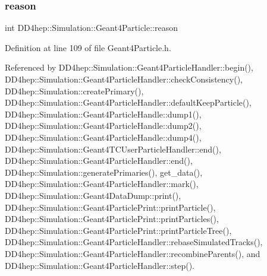\hypertarget{class_d_d4hep_1_1_simulation_1_1_geant4_particle_a290a8ba466d76df567c0a9809a80fbc1}{}\label{class_d_d4hep_1_1_simulation_1_1_geant4_particle_a290a8ba466d76df567c0a9809a80fbc1} 
\subsubsection{\texorpdfstring{reason}{reason}}
{\footnotesize\ttfamily int D\+D4hep\+::\+Simulation\+::\+Geant4\+Particle\+::reason}



Definition at line 109 of file Geant4\+Particle.\+h.



Referenced by D\+D4hep\+::\+Simulation\+::\+Geant4\+Particle\+Handler\+::begin(), D\+D4hep\+::\+Simulation\+::\+Geant4\+Particle\+Handler\+::check\+Consistency(), D\+D4hep\+::\+Simulation\+::create\+Primary(), D\+D4hep\+::\+Simulation\+::\+Geant4\+Particle\+Handler\+::default\+Keep\+Particle(), D\+D4hep\+::\+Simulation\+::\+Geant4\+Particle\+Handle\+::dump1(), D\+D4hep\+::\+Simulation\+::\+Geant4\+Particle\+Handle\+::dump2(), D\+D4hep\+::\+Simulation\+::\+Geant4\+Particle\+Handle\+::dump4(), D\+D4hep\+::\+Simulation\+::\+Geant4\+T\+C\+User\+Particle\+Handler\+::end(), D\+D4hep\+::\+Simulation\+::\+Geant4\+Particle\+Handler\+::end(), D\+D4hep\+::\+Simulation\+::generate\+Primaries(), get\+\_\+data(), D\+D4hep\+::\+Simulation\+::\+Geant4\+Particle\+Handler\+::mark(), D\+D4hep\+::\+Simulation\+::\+Geant4\+Data\+Dump\+::print(), D\+D4hep\+::\+Simulation\+::\+Geant4\+Particle\+Print\+::print\+Particle(), D\+D4hep\+::\+Simulation\+::\+Geant4\+Particle\+Print\+::print\+Particles(), D\+D4hep\+::\+Simulation\+::\+Geant4\+Particle\+Print\+::print\+Particle\+Tree(), D\+D4hep\+::\+Simulation\+::\+Geant4\+Particle\+Handler\+::rebase\+Simulated\+Tracks(), D\+D4hep\+::\+Simulation\+::\+Geant4\+Particle\+Handler\+::recombine\+Parents(), and D\+D4hep\+::\+Simulation\+::\+Geant4\+Particle\+Handler\+::step().

\hypertarget{class_d_d4hep_1_1_simulation_1_1_geant4_particle_a45f03922ef0363d2598befeec4027d59}{}\label{class_d_d4hep_1_1_simulation_1_1_geant4_particle_a45f03922ef0363d2598befeec4027d59} 

